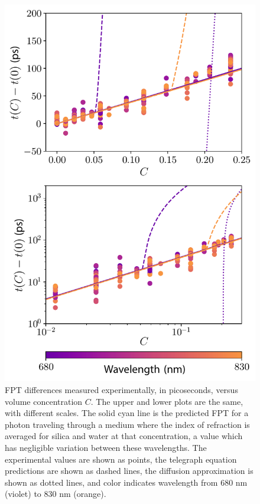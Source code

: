 \begin{figure}[htp]
\includegraphics[width=0.75\columnwidth]{Figures/final_predictions_with_data.pdf}
\caption{\label{fig:alldata} FPT differences measured experimentally, in picoseconds, versus volume concentration $C$. The upper and lower plots are the same, with different scales. The solid cyan line is the predicted FPT for a photon traveling through a medium where the index of refraction is averaged for silica and water at that concentration, a value which has negligible variation between these wavelengths. The experimental values are shown as points, the telegraph equation predictions are shown as dashed lines, the diffusion approximation is shown as dotted lines, and color indicates wavelength from 680 nm (violet) to 830 nm (orange). }
\end{figure}

